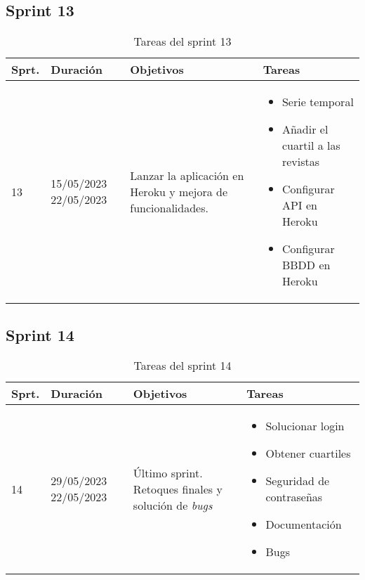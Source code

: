 
\subsection{Sprint 13}
\begin{table}[h]
\centering
\begin{tabularx}{\textwidth}{llll}
\toprule
\textbf{Sprt.} & \textbf{Duración} & \textbf{Objetivos} & \textbf{Tareas}\\
\midrule
    13 & \parbox{55}{15/05/2023 22/05/2023} & \parbox{80}{Lanzar la aplicación en Heroku y mejora de funcionalidades.} & \parbox{150}{\begin{itemize}\item Serie temporal \item Añadir el cuartil a las revistas \item  Configurar API en Heroku \item Configurar BBDD en Heroku\end{itemize}}\\
\bottomrule
\end{tabularx}
\caption{Tareas del sprint 13}
\label{tab:sprint13}
\end{table}


\subsection{Sprint 14}
\begin{table}[h]
\centering
\begin{tabularx}{\textwidth}{llll}
\toprule
\textbf{Sprt.} & \textbf{Duración} & \textbf{Objetivos} & \textbf{Tareas}\\
\midrule
    14 & \parbox{55}{29/05/2023 22/05/2023} & \parbox{80}{Último sprint. Retoques finales y solución de \textit{bugs}} & \parbox{150}{\begin{itemize}\item Solucionar login \item Obtener cuartiles \item  Seguridad de contraseñas \item Documentación \item Bugs\end{itemize}}\\
\bottomrule
\end{tabularx}
\caption{Tareas del sprint 14}
\label{tab:sprint14}
\end{table}

